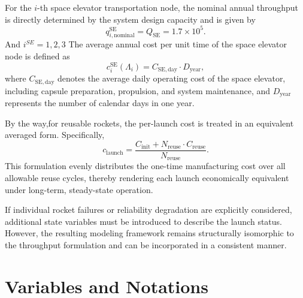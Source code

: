 \documentclass[12pt]{article}
\begin{document}
For the $i$-th space elevator transportation node, the nominal annual throughput is directly determined by the system design capacity and is given by
\[
q_{i,\mathrm{nominal}}^{\mathrm{SE}} = Q_{\mathrm{SE}} = 1.7 \times 10^{5}.
\]
And $i^{SE}=1,2,3$
The average annual cost per unit time of the space elevator node is defined as
\[
c_i^{\mathrm{SE}}(\Lambda_i)
= C_{\mathrm{SE,day}} \cdot D_{\mathrm{year}},
\]
where $C_{\mathrm{SE,day}}$ denotes the average daily operating cost of the space elevator, including capsule preparation, propulsion, and system maintenance, and $D_{\mathrm{year}}$ represents the number of calendar days in one year.

By the way,for reusable rockets, the per-launch cost is treated in an equivalent averaged form. Specifically,
\[
c_{\mathrm{launch}}
= \frac{C_{\mathrm{init}} + N_{\mathrm{reuse}} \cdot C_{\mathrm{reuse}}}{N_{\mathrm{reuse}}}.
\]
This formulation evenly distributes the one-time manufacturing cost over all allowable reuse cycles, thereby rendering each launch economically equivalent under long-term, steady-state operation.

If individual rocket failures or reliability degradation are explicitly considered, additional state variables must be introduced to describe the launch status. However, the resulting modeling framework remains structurally isomorphic to the throughput formulation and can be incorporated in a consistent manner.

\section{Variables and Notations}
\end{document}
